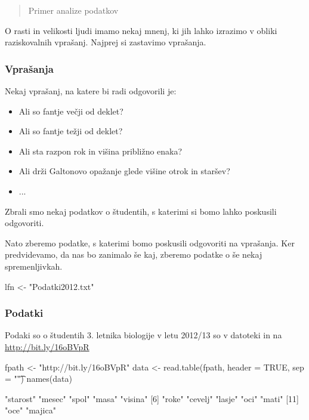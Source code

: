  {\maketitle}
 {\frame{\titlepage}}
\tableofcontents
\begin{abstract}
 Primer analize podatkov
\end{abstract}
O rasti in velikosti ljudi imamo nekaj mnenj, ki jih lahko izrazimo v obliki raziskovalnih vprašanj. Najprej si zastavimo vprašanja.
\begin{frame}[fragile]
\frametitle{Vprašanja}
Nekaj vprašanj, na katere bi radi odgovorili je:
\begin{itemize}
  \item Ali so fantje večji od deklet?
  \item Ali so fantje težji od deklet?
  \item Ali sta razpon rok in višina približno enaka?
  \item Ali drži Galtonovo opažanje glede višine otrok in staršev?
  \item ...
\end{itemize}
Zbrali smo nekaj podatkov o študentih, s katerimi si bomo lahko poskusili odgovoriti.
\end{frame}
Nato zberemo podatke, s katerimi bomo poskusili odgovoriti na vprašanja. Ker predvidevamo, da nas bo zanimalo še kaj, zberemo podatke o še nekaj spremenljivkah.
\begin{Schunk}
\begin{Sinput}
  lfn <- "Podatki2012.txt"
\end{Sinput}
\end{Schunk}

\begin{frame}[fragile]
\frametitle{Podatki}
Podaki so o študentih 3. letnika biologije v letu 2012/13 so v datoteki  in na \url{http://bit.ly/16oBVpR}
\begin{Schunk}
\begin{Sinput}
  fpath <- "http://bit.ly/16oBVpR"
  data <- read.table(fpath, header = TRUE, sep = "\t")
  names(data)
\end{Sinput}
\begin{Soutput}
 [1] "starost" "mesec"   "spol"    "masa"    "visina" 
 [6] "roke"    "cevelj"  "lasje"   "oci"     "mati"   
[11] "oce"     "majica" 
\end{Soutput}
\end{Schunk}
\end{frame}

